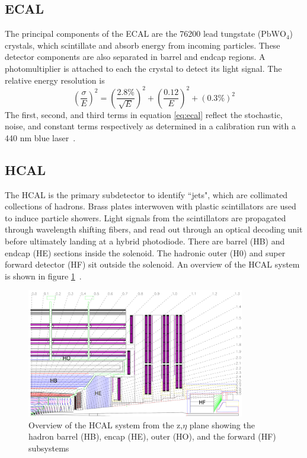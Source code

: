 \subsection{ECAL}

The principal components of the ECAL are the 76200 lead tungstate ($\text{PbWO}_4$) crystals, which scintillate and absorb energy from incoming particles. 
These detector components are also separated in barrel and endcap regions. A photomultiplier is attached to each the crystal to detect its light signal. The relative energy resolution is 
\begin{equation*}
\label{eq:ecal}
\left(\frac{\sigma}{E}\right)^2 = \left( \frac{2.8\%}{\sqrt{E}}  \right)^2 + \left( \frac{0.12}{E}  \right)^2 + (0.3\%)^2 
\end{equation*}
 The first, second, and third terms in equation \ref{eq:ecal} reflect the stochastic, noise, and constant terms respectively as determined in a calibration run with a 440 nm blue laser~\cite{Chatrchyan:2008zzk,Eichhorn:2112017}. 

\subsection{HCAL} 
The HCAL is the primary subdetector to identify ``jets", which are collimated collections of hadrons. 
Brass plates interwoven with plastic scintillators are used to induce particle showers. 
Light signals from the scintillators are propagated through wavelength shifting fibers, and read out through an optical decoding unit before ultimately landing at a hybrid photodiode. 
There are barrel (HB) and endcap (HE) sections inside the solenoid. The hadronic outer (H0) and super forward detector (HF) sit outside the solenoid. An overview of the HCAL system is shown in figure \ref{fig:hcal}~\cite{Chatrchyan:2008zzk,Eichhorn:2112017}. 

\begin{figure}[ht!b]
  \centering
\includegraphics[width=0.85\textwidth]{figures/HCAL.png}    
    \caption{\label{fig:hcal} Overview of the HCAL system from the z,$\eta$ plane showing the hadron barrel (HB), encap (HE), outer (HO), and the forward (HF) subsystems~\cite{Chatrchyan:2008zzk}}
\end{figure}




